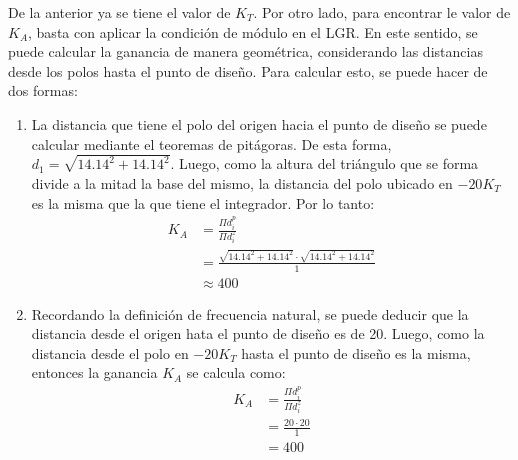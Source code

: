 \documentclass[
  11pt,
  letterpaper,
   addpoints,
   answers
  ]{exam}
\begin{document}
\begin{questions}
\begin{solution}
De la anterior ya se tiene el valor de $K_T$. Por otro lado, para encontrar le valor de $K_A$, basta con aplicar la condición de módulo en el LGR. En este sentido, se puede calcular la ganancia de manera geométrica, considerando las distancias desde los polos hasta el punto de diseño. Para calcular esto, se puede hacer de dos formas:
\begin{enumerate}
    \item La distancia que tiene el polo del origen hacia el punto de diseño se puede calcular mediante el teoremas de pitágoras. De esta forma, $d_1=\sqrt{14.14^2+14.14^2}$. Luego, como la altura del triángulo que se forma divide a la mitad la base del mismo, la distancia del polo ubicado en $-20K_T$ es la misma que la que tiene el integrador. Por lo tanto:
    \begin{align}
        K_A&=\frac{\Pi d_i^p}{\Pi d_i^z} \nonumber\\
        &=\frac{\sqrt{14.14^2+14.14^2}\cdot \sqrt{14.14^2+14.14^2}}{1} \nonumber \\
        &\approx 400
    \end{align}
    \item Recordando la definición de frecuencia natural, se puede deducir que la distancia desde el origen hata el punto de diseño es de 20. Luego, como la distancia desde el polo en $-20K_T$ hasta el punto de diseño es la misma, entonces la ganancia $K_A$ se calcula como:
    \begin{align}
        K_A&=\frac{\Pi d_i^p}{\Pi d_i^z} \nonumber\\
        &=\frac{20\cdot 20}{1} \nonumber \\
        &= 400
    \end{align}
\end{enumerate}

\end{solution}
\end{questions}
\end{document}
